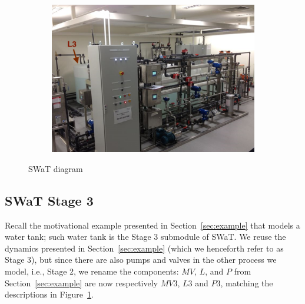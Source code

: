 {{\begin{figure}[htb]
\begin{subfigure}[b]{.35\linewidth}
  \end{subfigure}
  \begin{subfigure}[b]{.35\linewidth}
  \includegraphics[width=\linewidth]{Figures/testbed2.png}
  \end{subfigure}
  
    \caption{SWaT diagram}
  \label{fig:SWaTSchema}
\end{figure}

\subsection{SWaT Stage 3}
Recall the motivational example presented in Section~\ref{sec:example} that models a water tank; such water tank is the Stage 3 submodule of SWaT. We reuse the dynamics presented in Section~\ref{sec:example} (which we henceforth refer to as Stage 3), but since there are also pumps and valves in the other process we model, i.e., Stage 2, we rename the components: $MV$, $L$, and $P$ from Section~\ref{sec:example} are now respectively $MV3$, $L3$ and $P3$, matching the descriptions in Figure~\ref{fig:SWaTSchema}.

}}
